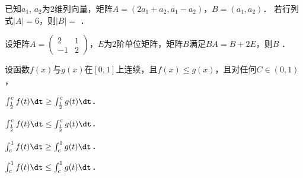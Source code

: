 \documentclass[plain,noanswer,medmath]{../../template/jnuexam}
\begin{document}












\begin{problem}
已知$a_1$, $a_2$为$2$维列向量，矩阵$A = (2a_1 + a_2,a_1 - a_2)$，$B = (a_1,a_2)$．
若行列式$|A| = 6$，则$|B| =$ \fillin{}．
\end{problem}


\begin{problem}
设矩阵$A = \begin{pmatrix}
   2 & 1 \\
  -1 & 2
\end{pmatrix}$，$E$为$2$阶单位矩阵，矩阵$B$满足$BA = B + 2E$，则$B$ \fillin{}．
\end{problem}










\begin{problem}
设函数$f(x)$与$g(x)$在$[0,1]$上连续，且$f(x) \le g(x)$，且对任何$C\in(0,1)$，\pickout{}
\begin{abcd}
\item $\int_{\frac{1}{2}}^c f(t)\dt \ge \int_{\frac{1}{2}}^c g(t)\dt$．
\item $\int_{\frac{1}{2}}^c f(t)\dt \le \int_{\frac{1}{2}}^c g(t)\dt$．
\item $\int_c^1 f(t)\dt \ge \int_c^1 g(t)\dt$．
\item $\int_c^1 f(t)\dt \le \int_c^1 g(t)\dt$．
\end{abcd}
\end{problem}








\end{document}
